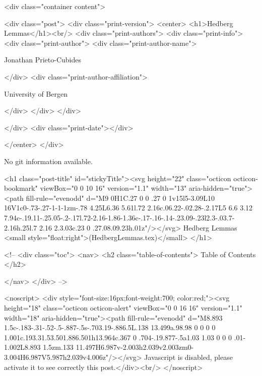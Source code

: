       <div class="container content">
        







<div class="post">
  <div class="print-version">
    <center>
      <h1>Hedberg Lemmas</h1><br/>
        <div class="print-authors">
          <div class="print-info">
            <div class="print-author">
              <div class="print-author-name">
                
                  Jonathan Prieto-Cubides
                
              </div>
              <div class="print-author-affiliation">
                
                  University of Bergen
                
                </div>
            </div>
          </div>
          
          
        </div>
        <div class="print-date"></div>
        
        
    </center>
  </div>

  
  No git information available.
  

  <h1 class="post-title" id="stickyTitle"><svg height="22" class="octicon octicon-bookmark" viewBox="0 0 10 16" version="1.1" width="13" aria-hidden="true"><path fill-rule="evenodd" d="M9 0H1C.27 0 0 .27 0 1v15l5-3.09L10 16V1c0-.73-.27-1-1-1zm-.78 4.25L6.36 5.61l.72 2.16c.06.22-.02.28-.2.17L5 6.6 3.12 7.94c-.19.11-.25.05-.2-.17l.72-2.16-1.86-1.36c-.17-.16-.14-.23.09-.23l2.3-.03.7-2.16h.25l.7 2.16 2.3.03c.23 0 .27.08.09.23h.01z"/></svg> Hedberg Lemmas <small style="float:right">(HedbergLemmas.tex)</small>
  </h1>

  <!-- 
  <div class="toc">
    <nav>
    <h2 class="table-of-contents"> Table of Contents </h2>
      

    </nav>
  </div>
   -->

  <noscript>
  <div style="font-size:16px;font-weight:700; color:red;"><svg height="18" class="octicon octicon-alert" viewBox="0 0 16 16" version="1.1" width="18" aria-hidden="true"><path fill-rule="evenodd" d="M8.893 1.5c-.183-.31-.52-.5-.887-.5s-.703.19-.886.5L.138 13.499a.98.98 0 0 0 0 1.001c.193.31.53.501.886.501h13.964c.367 0 .704-.19.877-.5a1.03 1.03 0 0 0 .01-1.002L8.893 1.5zm.133 11.497H6.987v-2.003h2.039v2.003zm0-3.004H6.987V5.987h2.039v4.006z"/></svg> Javascript is disabled, please activate it to see correctly this post.</div><br/>
  </noscript>

